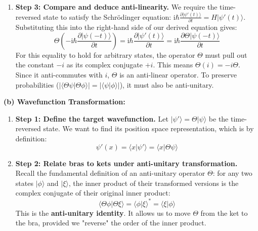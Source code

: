 \begin{solution}
\begin{enumerate}
    \item \textbf{Step 3: Compare and deduce anti-linearity.}
    We require the time-reversed state to satisfy the Schrödinger equation: $\mathrm{i}\hbar \frac{\partial |\psi'(t)\rangle}{\partial t} = H |\psi'(t)\rangle$. Substituting this into the right-hand side of our derived equation gives:
    \[ \Theta \left( -\mathrm{i}\hbar \frac{\partial |\psi(-t)\rangle}{\partial t} \right) = \mathrm{i}\hbar \frac{\partial |\psi'(t)\rangle}{\partial t} = \mathrm{i}\hbar \frac{\partial \Theta |\psi(-t)\rangle}{\partial t} \]
    For this equality to hold for arbitrary states, the operator $\Theta$ must pull out the constant $-i$ as its complex conjugate $+i$. This means $\Theta(i) = -i \Theta$. Since it anti-commutes with $i$, $\Theta$ is an anti-linear operator. To preserve probabilities ($|\langle \Theta\psi | \Theta\phi \rangle| = |\langle \psi | \phi \rangle|$), it must also be anti-unitary.
\end{enumerate}

\textbf{(b) Wavefunction Transformation:}
\begin{enumerate}
    \item \textbf{Step 1: Define the target wavefunction.}
    Let $|\psi'\rangle = \Theta |\psi\rangle$ be the time-reversed state. We want to find its position space representation, which is by definition:
    \[ \psi'(x) = \langle x | \psi'\rangle = \langle x | \Theta \psi \rangle \]

    \item \textbf{Step 2: Relate bras to kets under anti-unitary transformation.}
    Recall the fundamental definition of an anti-unitary operator $\Theta$: for any two states $|\phi\rangle$ and $|\xi\rangle$, the inner product of their transformed versions is the complex conjugate of their original inner product:
    \[ \langle \Theta \phi | \Theta \xi \rangle = \langle \phi | \xi \rangle^* = \langle \xi | \phi \rangle \]
    This is the \textbf{anti-unitary identity}. It allows us to move $\Theta$ from the ket to the bra, provided we "reverse" the order of the inner product.


\end{enumerate}
\end{solution}
